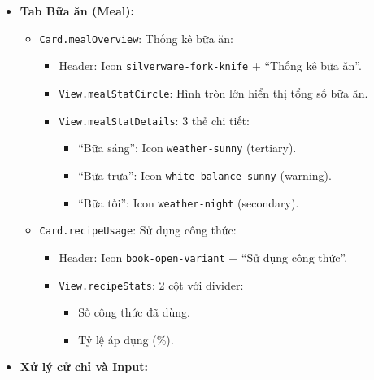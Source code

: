 \begin{itemize}
\begin{itemize}
\begin{itemize}
\begin{itemize}
                            \item \texttt{SpendingDetail}: Trung bình/danh sách + Tiết kiệm so với tháng trước.
                        \end{itemize}
                \end{itemize}
        \end{itemize}
    \item \textbf{Tab Bữa ăn (Meal):}
        \begin{itemize}
            \item \texttt{Card.mealOverview}: Thống kê bữa ăn:
                \begin{itemize}
                    \item Header: Icon \texttt{silverware-fork-knife} + ``Thống kê bữa ăn''.
                    \item \texttt{View.mealStatCircle}: Hình tròn lớn hiển thị tổng số bữa ăn.
                    \item \texttt{View.mealStatDetails}: 3 thẻ chi tiết:
                        \begin{itemize}
                            \item ``Bữa sáng'': Icon \texttt{weather-sunny} (tertiary).
                            \item ``Bữa trưa'': Icon \texttt{white-balance-sunny} (warning).
                            \item ``Bữa tối'': Icon \texttt{weather-night} (secondary).
                        \end{itemize}
                \end{itemize}
            \item \texttt{Card.recipeUsage}: Sử dụng công thức:
                \begin{itemize}
                    \item Header: Icon \texttt{book-open-variant} + ``Sử dụng công thức''.
                    \item \texttt{View.recipeStats}: 2 cột với divider:
                        \begin{itemize}
                            \item Số công thức đã dùng.
                            \item Tỷ lệ áp dụng (\%).
                        \end{itemize}
                \end{itemize}
        \end{itemize}
    \item \textbf{Xử lý cử chỉ và Input:}

\end{itemize}
